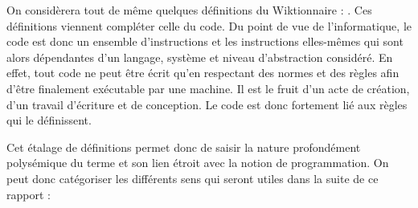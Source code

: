 \documentclass[12pt]{article} %
\begin{document}
On considèrera tout de même quelques définitions du Wiktionnaire :
\cite{noauthor_undated-vw}. Ces définitions viennent compléter celle du code. Du point de vue de l'informatique, le code est donc un ensemble d'instructions et les instructions elles-mêmes qui sont alors dépendantes d'un langage, système et niveau d'abstraction considéré. En effet, tout code ne peut être écrit qu'en respectant des normes et des règles afin d'être finalement exécutable par une machine. Il est le fruit d'un acte de création, d'un travail d'écriture et de conception. Le code est donc fortement lié aux règles qui le définissent. 

Cet étalage de définitions permet donc de saisir la nature profondément polysémique du terme et son lien étroit avec la notion de programmation. On peut donc catégoriser les différents sens qui seront utiles dans la suite de ce rapport :
\end{document}
